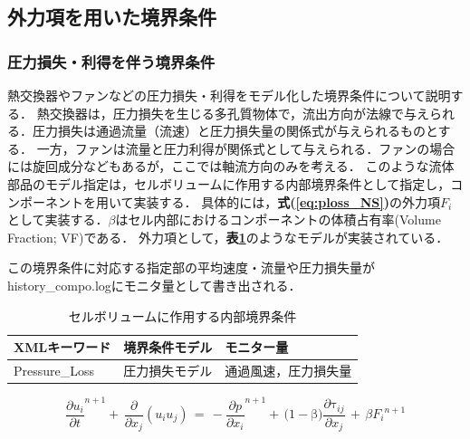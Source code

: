\pagebreak
%
\subsection{外力項を用いた境界条件}

\subsubsection{圧力損失・利得を伴う境界条件}
熱交換器やファンなどの圧力損失・利得をモデル化した境界条件について説明する．
熱交換器は，圧力損失を生じる多孔質物体で，流出方向が法線で与えられる．圧力損失は通過流量（流速）と圧力損失量の関係式が与えられるものとする．
一方，ファンは流量と圧力利得が関係式として与えられる．ファンの場合には旋回成分などもあるが，ここでは軸流方向のみを考える．
このような流体部品のモデル指定は，セルボリュームに作用する内部境界条件として指定し，コンポーネントを用いて実装する．
具体的には，\textbf{式(\ref{eq:ploss_NS})}の外力項$F_{i}$として実装する．$\beta$はセル内部におけるコンポーネントの体積占有率(Volume Fraction; VF)である．
外力項として，\textbf{表\ref{tbl:ploss_model}}のようなモデルが実装されている．

この境界条件に対応する指定部の平均速度・流量や圧力損失量がhistory\_compo.logにモニタ量として書き出される．

\begin{table}[htdp]
\caption{セルボリュームに作用する内部境界条件}
\begin{center}
\small
\begin{tabular}{lll} \toprule
XMLキーワード & 境界条件モデル & モニター量\\ \midrule
Pressure\_Loss & 圧力損失モデル & 通過風速，圧力損失量\\ 
\bottomrule
\end{tabular}
\end{center}
\label{tbl:ploss_model}
\end{table}

\begin{equation}
{\frac{\partial{u}_{i}}{\partial{t}}}^{{n}{+}{1}}{+}\,\frac{\partial}{\partial{x}_{j}}\left({{u}_{i}{u}_{j}}\right)
\,{=}\,
{-}{\frac{\partial{p}}{\partial{x}_{i}}}^{{n}{+}{1}}{+}\,{(}{1}{-}\mathrm{\beta}{)}\frac{\partial{\mathrm{\tau}}_{ij}}{\partial{x}_{j}}\,{+}\,\beta {F_{i}}^{n+1}
\label{eq:ploss_NS}
\end{equation}

